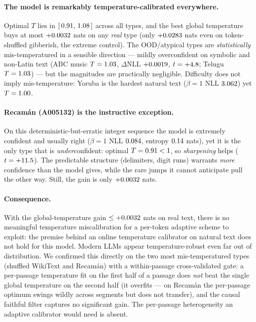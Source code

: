 \documentclass[11pt]{article}
\begin{document}
\paragraph{The model is remarkably temperature-calibrated everywhere.}
Optimal $T$ lies in $[\,0.91,\,1.08\,]$ across all types, and the best
global temperature buys at most $+0.0032$ nats on any \emph{real} type
(only $+0.0283$ nats even on token-shuffled gibberish, the
extreme control). The OOD/atypical types are \emph{statistically} mis-temperatured
in a sensible direction --- mildly overconfident on symbolic and non-Latin text
(ABC music $T=1.03$, $\Delta$NLL $+0.0019$,
$t=+4.8$; Telugu $T=1.03$) --- but the magnitudes are
practically negligible. Difficulty does not imply mis-temperature: Yoruba is the
hardest natural text ($\beta{=}1$ NLL $3.062$) yet
$T=1.00$.

\paragraph{Recam\'an (A005132) is the instructive exception.}
On this deterministic-but-erratic integer sequence the model is extremely confident
and usually right ($\beta{=}1$ NLL $0.084$, entropy
$0.14$ nats), yet it is the only type that is \emph{under}confident:
optimal $T=0.91<1$, so \emph{sharpening} helps
($t=+11.5$). The predictable structure (delimiters, digit runs)
warrants \emph{more} confidence than the model gives, while the rare jumps it cannot
anticipate pull the other way. Still, the gain is only $+0.0032$ nats.

\paragraph{Consequence.}
With the global-temperature gain $\le+0.0032$ nats on real text, there is
no meaningful temperature miscalibration for a per-token adaptive scheme to exploit:
the premise behind an online temperature calibrator on natural text does not hold for
this model. Modern LLMs appear temperature-robust even far out of distribution. We
confirmed this directly on the two most mis-temperatured types (shuffled WikiText and
Recam\'an) with a within-passage cross-validated gate: a per-passage temperature fit
on the first half of a passage does \emph{not} beat the single global temperature on
the second half (it overfits --- on Recam\'an the per-passage optimum swings wildly
across segments but does not transfer), and the causal faithful filter captures no
significant gain. The per-passage heterogeneity an adaptive calibrator would need is
absent.
\end{document}
